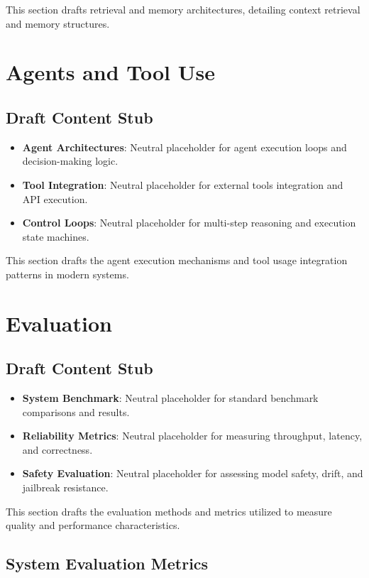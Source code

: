 \documentclass[11pt]{article}
\begin{document}
This section drafts retrieval and memory architectures, detailing context retrieval and memory structures.

\section{Agents and Tool Use}

\subsection{Draft Content Stub}

\begin{itemize}
  \item \textbf{Agent Architectures}: Neutral placeholder for agent execution loops and decision-making logic.
  \item \textbf{Tool Integration}: Neutral placeholder for external tools integration and API execution.
  \item \textbf{Control Loops}: Neutral placeholder for multi-step reasoning and execution state machines.
\end{itemize}

This section drafts the agent execution mechanisms and tool usage integration patterns in modern systems.

\section{Evaluation}

\subsection{Draft Content Stub}

\begin{itemize}
  \item \textbf{System Benchmark}: Neutral placeholder for standard benchmark comparisons and results.
  \item \textbf{Reliability Metrics}: Neutral placeholder for measuring throughput, latency, and correctness.
  \item \textbf{Safety Evaluation}: Neutral placeholder for assessing model safety, drift, and jailbreak resistance.
\end{itemize}

This section drafts the evaluation methods and metrics utilized to measure quality and performance characteristics.

\subsection{System Evaluation Metrics}
\end{document}

